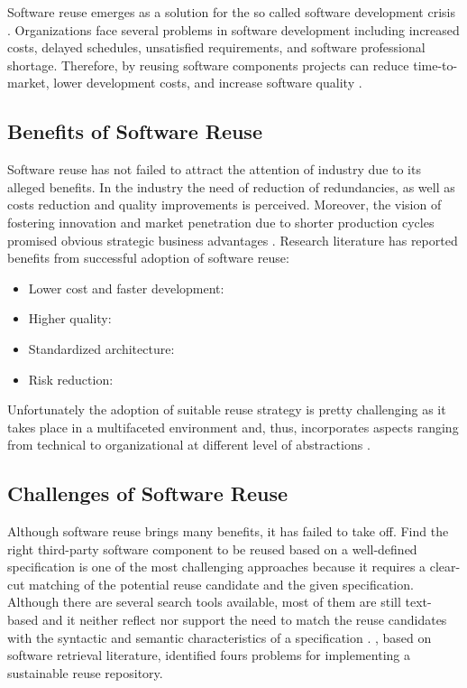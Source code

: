 Software reuse emerges as a solution for the so called software development crisis \citep{Kim1992}. Organizations face several problems in software development including increased costs, delayed schedules, unsatisfied requirements, and software professional shortage. Therefore, by reusing software components projects can reduce time-to-market, lower development costs, and increase software quality \cite{Frakes2005}.

\subsection{Benefits of Software Reuse}
Software reuse has not failed to attract the attention of industry due to its alleged benefits. In the industry the need of reduction of redundancies, as well as costs reduction and quality improvements is perceived. Moreover, the vision of fostering innovation and market penetration due to shorter production cycles promised obvious strategic business advantages \citep{Bauer2016}. Research literature has reported benefits from successful adoption of software reuse:

\begin{itemize}
\item Lower cost and faster development:
\item Higher quality:
\item Standardized architecture:
\item Risk reduction: 
\end{itemize}

Unfortunately the adoption of suitable reuse strategy is pretty challenging as it takes place in a multifaceted environment and, thus, incorporates aspects ranging from technical to organizational at different level of abstractions \citep{Bauer2016}.

\subsection{Challenges of Software Reuse}
\label{sec:sw-challenges}
Although software reuse brings many benefits, it has failed to take off. Find the right third-party software component to be reused based on a well-defined specification is one of the most challenging approaches because it requires a clear-cut matching of the potential reuse candidate and the given specification. Although there are several search tools available, most of them are still text-based and it neither reflect nor support the need to match the reuse candidates with the syntactic and semantic characteristics of a specification \citep{Hummel2013}. \cite{Hummel2013}, based on software retrieval literature, identified fours problems for implementing a sustainable reuse repository.

